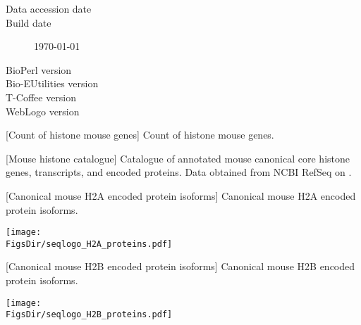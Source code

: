   \begin{description}
    \item[Data accession date] \hfill \newline
      \printdate{\SequencesDate}
    \item[Build date] \hfill \newline
      \today
    \item[BioPerl version] \hfill \newline
      \BioPerlVersion{}
    \item[Bio-EUtilities version] \hfill \newline
      \BioEUtilitiesVersion
    \item[T-Coffee version] \hfill \newline
      \TCoffeVersion
    \item[WebLogo version] \hfill \newline
      \WebLogoVersion
  \end{description}

  \newpage
  \begin{center}
  [Count of histone mouse genes]%
                   {Count of histone mouse genes.}
  
  \end{center}

  \newpage
  \begin{center}
  [Mouse histone catalogue]{%
    Catalogue of annotated mouse canonical core histone genes, transcripts,
    and encoded proteins.
    Data obtained from NCBI RefSeq \citep{OLearyRefseq2016} on \SequencesDate{}.
  }
  \label{tab:mouse:histone-catalogue}
  
  \end{center}

  \newpage
  \begin{minipage}{\textwidth}
  \begin{center}
  [Canonical mouse H2A encoded protein isoforms]%
                   {Canonical mouse H2A encoded protein isoforms.}
  
  \texttt{[image: \\FigsDir/seqlogo\_H2A\_proteins.pdf]}
  \end{center}
  \end{minipage}

  \newpage
  \begin{minipage}{\textwidth}
  \begin{center}
  [Canonical mouse H2B encoded protein isoforms]%
                   {Canonical mouse H2B encoded protein isoforms.}
  
  \texttt{[image: \\FigsDir/seqlogo\_H2B\_proteins.pdf]}
  \end{center}
  \end{minipage}

